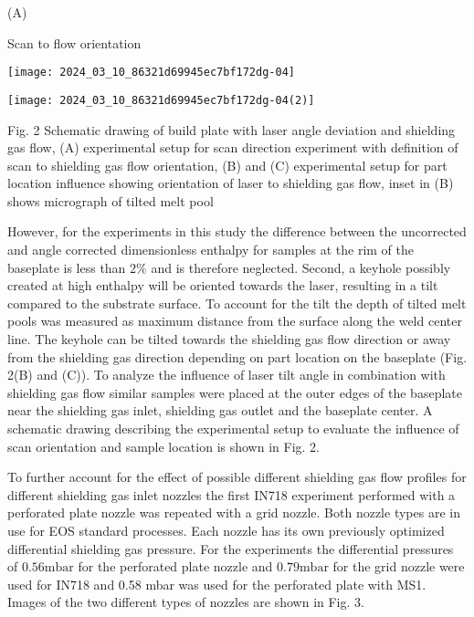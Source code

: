 \documentclass[10pt]{article}
\begin{document}
(A)

Scan to flow orientation

\begin{center}
\texttt{[image: 2024\_03\_10\_86321d69945ec7bf172dg-04]}
\end{center}

\begin{center}
\texttt{[image: 2024\_03\_10\_86321d69945ec7bf172dg-04(2)]}
\end{center}

Fig. 2 Schematic drawing of build plate with laser angle deviation and shielding gas flow, (A) experimental setup for scan direction experiment with definition of scan to shielding gas flow orientation, (B) and (C) experimental setup for part location influence showing orientation of laser to shielding gas flow, inset in (B) shows micrograph of tilted melt pool

However, for the experiments in this study the difference between the uncorrected and angle corrected dimensionless enthalpy for samples at the rim of the baseplate is less than $2 \%$ and is therefore neglected. Second, a keyhole possibly created at high enthalpy will be oriented towards the laser, resulting in a tilt compared to the substrate surface. To account for the tilt the depth of tilted melt pools was measured as maximum distance from the surface along the weld center line. The keyhole can be tilted towards the shielding gas flow direction or away from the shielding gas direction depending on part location on the baseplate (Fig. 2(B) and (C)). To analyze the influence of laser tilt angle in combination with shielding gas flow similar samples were placed at the outer edges of the baseplate near the shielding gas inlet, shielding gas outlet and the baseplate center. A schematic drawing describing the experimental setup to evaluate the influence of scan orientation and sample location is shown in Fig. 2.

To further account for the effect of possible different shielding gas flow profiles for different shielding gas inlet nozzles the first IN718 experiment performed with a perforated plate nozzle was repeated with a grid nozzle. Both nozzle types are in use for EOS standard processes. Each nozzle has its own previously optimized differential shielding gas pressure. For the experiments the differential pressures of $0.56 \mathrm{mbar}$ for the perforated plate nozzle and $0.79 \mathrm{mbar}$ for the grid nozzle were used for IN718 and 0.58 mbar was used for the perforated plate with MS1. Images of the two different types of nozzles are shown in Fig. 3.
\end{document}
